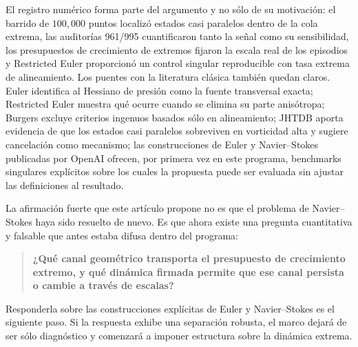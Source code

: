 \documentclass[11pt]{article}
\begin{document}
El registro numérico forma parte del argumento y no sólo de su motivación: el barrido de $100{,}000$ puntos localizó estados casi paralelos dentro de la cola extrema, las auditorías 961/995 cuantificaron tanto la señal como su sensibilidad, los presupuestos de crecimiento de extremos fijaron la escala real de los episodios y Restricted Euler proporcionó un control singular reproducible con tasa extrema de alineamiento. Los puentes con la literatura clásica también quedan claros. Euler identifica al Hessiano de presión como la fuente transversal exacta; Restricted Euler muestra qué ocurre cuando se elimina su parte anisótropa; Burgers excluye criterios ingenuos basados sólo en alineamiento; JHTDB aporta evidencia de que los estados casi paralelos sobreviven en vorticidad alta y sugiere cancelación como mecanismo; las construcciones de Euler y Navier--Stokes publicadas por OpenAI ofrecen, por primera vez en este programa, benchmarks singulares explícitos sobre los cuales la propuesta puede ser evaluada sin ajustar las definiciones al resultado.

La afirmación fuerte que este artículo propone no es que el problema de Navier--Stokes haya sido resuelto de nuevo. Es que ahora existe una pregunta cuantitativa y falsable que antes estaba difusa dentro del programa:

\begin{quote}
\textbf{¿Qué canal geométrico transporta el presupuesto de crecimiento extremo, y qué dinámica firmada permite que ese canal persista o cambie a través de escalas?}
\end{quote}

Responderla sobre las construcciones explícitas de Euler y Navier--Stokes es el siguiente paso. Si la respuesta exhibe una separación robusta, el marco dejará de ser sólo diagnóstico y comenzará a imponer estructura sobre la dinámica extrema.
\end{document}
